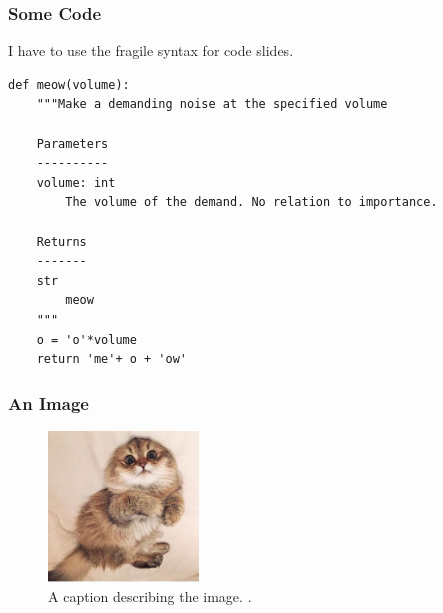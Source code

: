 \begin{frame}[fragile]
  \frametitle{Some Code}
        I have to use the fragile syntax for code slides.
        \begin{verbatim}
def meow(volume):
    """Make a demanding noise at the specified volume

    Parameters
    ----------
    volume: int
        The volume of the demand. No relation to importance.

    Returns
    -------
    str
        meow
    """
    o = 'o'*volume
    return 'me'+ o + 'ow'
\end{verbatim}
\end{frame}
\begin{frame}
  \frametitle{An Image}
  \begin{figure}[htbp!]
    \begin{center}
      \includegraphics[height=4cm]{./images/kitten}
    \end{center}
          \caption{A caption describing the image. \cite{lastname_firstword_1900}.}
    \label{fig:kittenfigure}
  \end{figure}
\end{frame}

